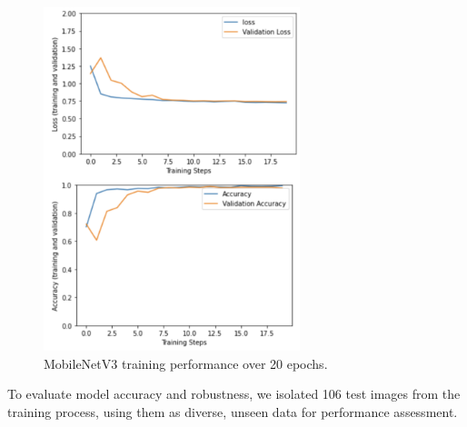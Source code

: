 \documentclass[conference]{IEEEtran}
\begin{document}
\begin{figure}[h]
\centerline{\includegraphics[height=10cm, width = .9\linewidth]{Images/Screen_Shot_2021-05-04_at_5.27.06_PM.pdf}}
\caption{MobileNetV3 training performance over 20 epochs. }
\label{MNStats}
\end{figure}

To evaluate model accuracy and robustness, we isolated 106 test images from the training process, using them as diverse, unseen data for performance assessment. 

\end{document}

